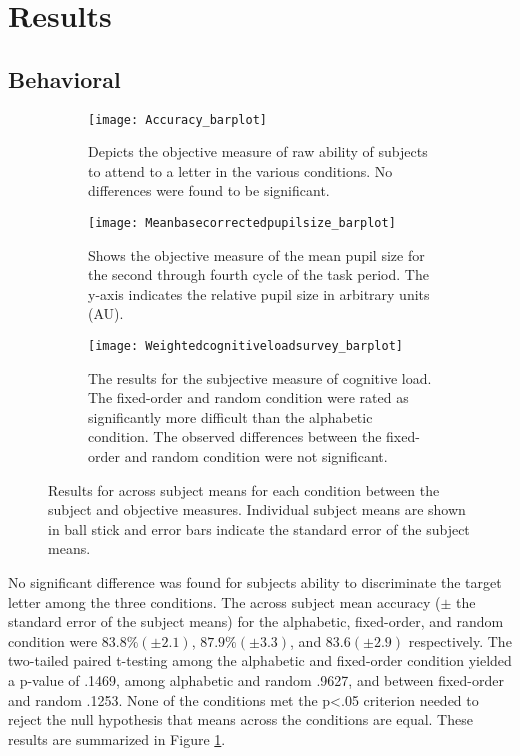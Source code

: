 \documentclass[10pt]{article}
\begin{document}
\section{Results}

\subsection{Behavioral}

\begin{figure}[t]
    \centering
    \begin{subfigure}[t]{.25\linewidth}
        \centering
      \texttt{[image: Accuracy\_barplot]}
      \caption{Depicts the objective measure of raw ability of subjects to attend
          to a letter in the various conditions.  No
          differences were found to be significant. }
      \label{accuracy}
    \end{subfigure}
    \qquad
    \begin{subfigure}[t]{.25\linewidth}
      \centering
      \texttt{[image: Meanbasecorrectedpupilsize\_barplot]}
      \caption{Shows the objective measure of the mean pupil size for the second
      through fourth cycle of the task period. The y-axis indicates the
  relative pupil size in arbitrary units (AU).} 
      \label{psBarplot}
    \end{subfigure}
    \qquad
    \begin{subfigure}[t]{.25\linewidth}
      \centering
      \texttt{[image: Weightedcognitiveloadsurvey\_barplot]}
      \caption{The results for the subjective measure of cognitive
  load.  The fixed-order and random condition were rated
  as significantly more difficult than the alphabetic
  condition. The observed differences between the fixed-order
  and random condition were not significant.}
      \label{cogLoad}
    \end{subfigure}
  \caption{Results for across subject means for each condition
      between the subject and objective measures. Individual
  subject means are shown in ball stick and error bars
  indicate the standard error of the subject means.}
\end{figure}

No significant difference was found for subjects ability to
discriminate the target letter among the three conditions.
The across subject mean accuracy ($\pm$ the standard error of
the subject means) for the alphabetic, fixed-order, and random
condition were $83.8 \% (\pm2.1)$, $87.9 \% (\pm3.3)$,
and $83.6 (\pm 2.9)$ respectively.  The two-tailed paired t-testing among 
the alphabetic and fixed-order condition yielded a p-value of .1469,
among alphabetic and random .9627, and between fixed-order and
random .1253.  None of the conditions met the p<.05 criterion needed
to reject the null hypothesis that means across the conditions are
equal. These results are summarized in Figure \ref{accuracy}.
\end{document}
